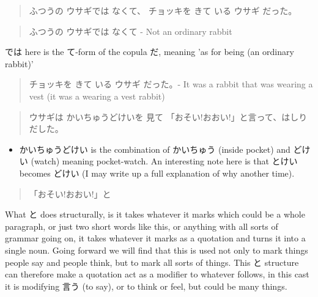 \documentclass[11pt]{article}
\begin{document}
\begin{quote}
ふつうの ウサギでは なくて、 チョッキを きて いる ウサギ だった。
\end{quote}
\begin{quote}
ふつうの ウサギでは なくて - Not an ordinary rabbit
\end{quote}
では here is the て-form of the copula だ, meaning 'as for being (an ordinary rabbit)'
\begin{quote}
チョッキを きて いる ウサギ だった。- It was a rabbit that was wearing a vest (it was a wearing a vest rabbit)
\end{quote}


\begin{quote}
ウサギは かいちゅうどけいを 見て 「おそい!おおい!」と言って、はしり だした。
\end{quote}
\begin{itemize}
\item かいちゅうどけい is the combination of かいちゅう (inside pocket) and どけい (watch) meaning pocket-watch. An interesting note here is that とけい becomes どけい (I may write up a full explanation of why another time).
\end{itemize}

\begin{quote}
「おそい!おおい!」と
\end{quote}
What と does structurally, is it takes whatever it marks which could be a whole paragraph, or just two short words like this, or anything with all sorts of grammar going on, it takes whatever it marks as a quotation and turns it into a single noun. Going forward we will find that this is used not only to mark things people say and people think, but to mark all sorts of things. This と structure can therefore make a quotation act as a modifier to whatever follows, in this cast it is modifying 言う (to say), or to think or feel, but could be many things.
\end{document}
